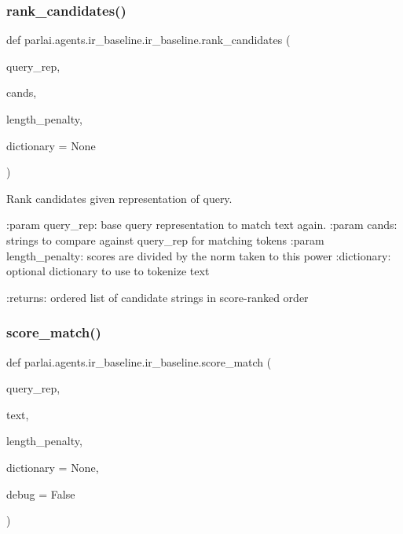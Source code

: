 \subsubsection{\texorpdfstring{rank\+\_\+candidates()}{rank\_candidates()}}
{\footnotesize\ttfamily def parlai.\+agents.\+ir\+\_\+baseline.\+ir\+\_\+baseline.\+rank\+\_\+candidates (\begin{DoxyParamCaption}\item[{}]{query\+\_\+rep,  }\item[{}]{cands,  }\item[{}]{length\+\_\+penalty,  }\item[{}]{dictionary = {\ttfamily None} }\end{DoxyParamCaption})}

\begin{DoxyVerb}Rank candidates given representation of query.

:param query_rep: base query representation to match text again.
:param cands: strings to compare against query_rep for matching tokens
:param length_penalty: scores are divided by the norm taken to this power
:dictionary: optional dictionary to use to tokenize text

:returns: ordered list of candidate strings in score-ranked order
\end{DoxyVerb}
 \mbox{\label{namespaceparlai_1_1agents_1_1ir__baseline_1_1ir__baseline_a64aaaccb38f5dd5f51c09439456b2f6e}} 
\subsubsection{\texorpdfstring{score\+\_\+match()}{score\_match()}}
{\footnotesize\ttfamily def parlai.\+agents.\+ir\+\_\+baseline.\+ir\+\_\+baseline.\+score\+\_\+match (\begin{DoxyParamCaption}\item[{}]{query\+\_\+rep,  }\item[{}]{text,  }\item[{}]{length\+\_\+penalty,  }\item[{}]{dictionary = {\ttfamily None},  }\item[{}]{debug = {\ttfamily False} }\end{DoxyParamCaption})}

